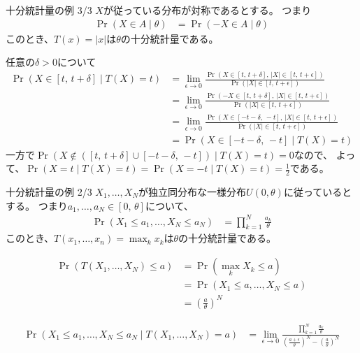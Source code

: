 \documentclass[lualatex,handout]{beamer}
\theoremstyle{definition}
\begin{document}
\begin{frame}{十分統計量の例 3/3}
$X$が従っている分布が対称であるとする。
つまり
\begin{align*}
\Pr(X\in A\mid\theta) &= \Pr(-X\in A\mid\theta)
\end{align*}
このとき、$T(x)=|x|$は$\theta$の十分統計量である。

任意の$\delta >0$について
\begin{align*}
\Pr(X\in [t,\,t+\delta]\mid T(X) = t)
 &= \lim_{\epsilon\to0} \frac{\Pr(X\in [t,\,t+\delta],\, |X|\in[t,\,t+\epsilon])}{\Pr(|X|\in[t,\,t+\epsilon])}\\
 &= \lim_{\epsilon\to0} \frac{\Pr(-X\in [t,\,t+\delta],\, |X|\in[t,\,t+\epsilon])}{\Pr(|X|\in[t,\,t+\epsilon])}\\
 &= \lim_{\epsilon\to0} \frac{\Pr(X\in [-t-\delta,\,-t],\, |X|\in[t,\,t+\epsilon])}{\Pr(|X|\in[t,\,t+\epsilon])}\\
 &= \Pr(X\in [-t-\delta,\,-t]\mid T(X) = t)
\end{align*}
一方で$\Pr(X\notin ([t,\,t+\delta] \cup [-t-\delta,\,-t])\mid T(X)=t)=0$なので、
よって、$\Pr(X=t\mid T(X)=t)=\Pr(X=-t\mid T(X)=t)=\frac12$である。
\end{frame}

\begin{frame}{十分統計量の例 2/3}
$X_1,\dotsc,X_N$が独立同分布な一様分布$U(0,\theta)$に従っているとする。
つまり$a_1,\dotsc,a_N\in[0,\,\theta]$について、
\begin{align*}
\Pr(X_1\le a_1,\dotsc, X_N\le a_N)&= \prod_{k=1}^N\frac{a_k}{\theta}
\end{align*}
このとき、$T(x_1,\dotsc,x_n) = \max_k x_k$は$\theta$の十分統計量である。

\begin{align*}
\Pr(T(X_1,\dotsc,X_N)\le a)&= \Pr(\max_k X_k\le a)\\
&= \Pr(X_1\le a,\dotsc, X_N\le a)\\
&= \left(\frac{a}{\theta}\right)^N
\end{align*}

\begin{align*}
\Pr(X_1\le a_1,\dotsc, X_N\le a_N\mid T(X_1,\dotsc,X_N)=a)&= \lim_{\epsilon\to0}\frac{\prod_{k=1}^N\frac{a_k}{\theta}}
{\left(\frac{a+\epsilon}{\theta}\right)^N-\left(\frac{a}{\theta}\right)^N}
\end{align*}
\end{frame}
\fi
\end{document}
